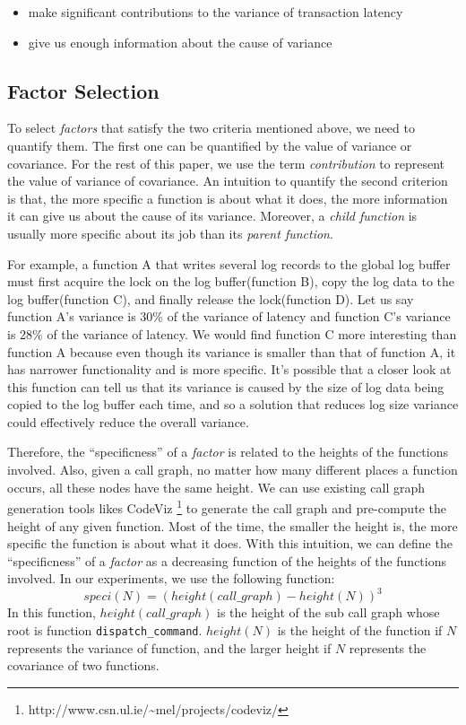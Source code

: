 \begin{itemize}
    \item make significant contributions to the variance of transaction latency
    \item give us enough information about the cause of variance
\end{itemize}

\subsection{Factor Selection}
To select \textit{factors} that satisfy the two criteria mentioned above, we 
need to quantify them. The first one can be quantified by the value of variance 
or covariance. For the rest of this paper, we use the term 
\textit{contribution} to represent the value of variance of covariance. An
intuition to quantify the second criterion is that, the more specific a
function is about what it does, the more information it can
give us about the cause of its variance. Moreover, a \textit{child function} is
usually more specific about its job than its \textit{parent function}.

For example, a function A that writes several log records to the global log
buffer must first acquire the lock on the log buffer(function B), copy the
log data to the log buffer(function C), and finally release the
lock(function D). Let us say function A's variance is 30\% of the
variance of latency and function C's variance is 28\% of the variance
of latency. We would find function C more interesting than function A
because even though its variance is smaller than that of function A, it
has narrower functionality and is more specific. It's possible that a closer
look at this function can tell us that its variance is caused by the size of
log data being copied to the log buffer each time, and so a solution that
reduces log size variance could effectively reduce the overall variance.

Therefore, the ``specificness'' of a \textit{factor} is related to the
heights of the functions involved. Also, given a call graph, no matter how 
many different places a function occurs, all these nodes have the same 
height. We can use existing call graph generation tools likes CodeViz
\footnote{http://www.csn.ul.ie/\textasciitilde{}mel/projects/codeviz/} to
generate the call graph and pre-compute the height of any given function. Most
of the time, the smaller the height is, the more specific the function is about
what it does. With this intuition, we can define the ``specificness'' of a
\textit{factor} as a decreasing function of the heights of the functions
involved. In our experiments, we use the following function:
\begin{equation}
speci(N) = (height(call\_graph) - height(N))^3
\label{eq:speci}
\end{equation}
In this function, $height(call\_graph)$ is the height of the sub call graph
whose root is function \texttt{dispatch\_command}. $height(N)$ is the height of 
the function if $N$ represents the variance of function, and the larger height
if $N$ represents the covariance of two functions.


